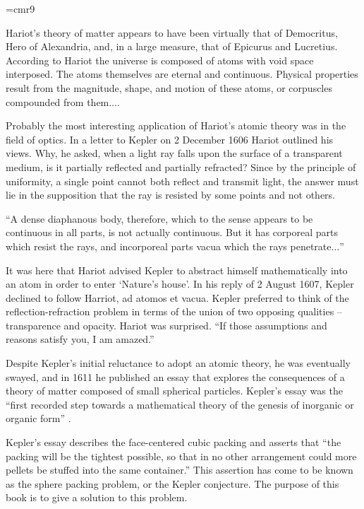 {
\narrower
\font\ninerm=cmr9
\ninerm

    Hariot's theory of matter appears to have been virtually that of Democritus,  Hero of Alexandria,  and, in a large measure, that of Epicurus
    and Lucretius. According to Hariot the universe is composed of atoms with void space interposed. The atoms themselves are eternal and
    continuous. Physical properties result from the magnitude, shape, and motion of these atoms, or corpuscles compounded from them$\ldots$.

    Probably the most interesting application of Hariot's atomic theory was in the field of optics. In a letter to Kepler on 2 December 1606
    Hariot outlined his views. Why, he asked, when a light ray falls upon the surface of a transparent medium, is it partially reflected and
    partially refracted? Since by the principle of uniformity, a single point cannot both reflect and transmit light, the answer must lie in the
    supposition that the ray is resisted by some points and not others.

    ``A dense diaphanous body, therefore, which to the sense appears to be continuous in all parts, is not actually continuous. But it has
    corporeal parts which resist the rays, and incorporeal parts vacua which the rays penetrate$\ldots$''

    It was here that Hariot advised Kepler to abstract himself mathematically into an atom in order to enter `Nature's house'. In his reply of 2
    August 1607, Kepler declined to follow Harriot, ad atomos et vacua. Kepler preferred to think of the reflection-refraction problem in terms
    of the union of two opposing qualities --
    transparence and opacity. Hariot was surprised. ``If those assumptions and reasons satisfy you, I
    am amazed.'' \cite[p.26]{Kar66}

}

\smallskip
Despite Kepler's initial reluctance to adopt an atomic theory, he
was eventually swayed, and in 1611 he published an essay that
explores the consequences of a theory of matter composed of small
spherical particles.  Kepler's essay was the ``first recorded step
towards a mathematical theory of the genesis of inorganic or
organic form'' \cite[p.v]{Why66}.

Kepler's essay describes
the face-centered cubic packing and asserts that ``the packing will
be the tightest possible, so that in no other arrangement  could more
pellets be stuffed into the same container.''  This assertion has
come to be known as the sphere packing problem, or the Kepler conjecture.   
The purpose of this book is to give a solution to this problem.

